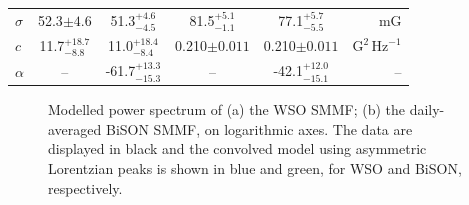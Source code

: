 \begin{table}[ht!]
\begin{center}
\begin{tabular}{l c c | c c r}
			{$\sigma$} & {52.3$\pm 4.6$} & {51.3$_{-4.5}^{+4.6}$} & {81.5$_{-1.1}^{+5.1}$} & {77.1$_{-5.5}^{+5.7}$} & {$\mathrm{mG}$} \\	
			
			{$c$} & {11.7$_{-8.8}^{+18.7}$} & {11.0$_{-8.4}^{+18.4}$} & {0.210$\pm 0.011$} & {0.210$\pm 0.011$} & {$\mathrm{G}^2 \, \mathrm{Hz}^{-1}$} \\	
			
			{$\alpha$} & {--} & {-61.7$_{-15.3}^{+13.3}$} & {--} & {-42.1$_{-15.1}^{+12.0}$} & {--} \\	
			\hline
		\end{tabular}
	\end{center}
\end{table}





\begin{figure}[ht!]
	\centering
	\qquad
	\caption{Modelled power spectrum of (a) the WSO SMMF; (b) the daily-averaged BiSON SMMF, on logarithmic axes. The data are displayed in black and the convolved model using asymmetric Lorentzian peaks is shown in blue and green, for WSO and BiSON, respectively.} 
	\label{fig:WSO_and_24h_BiSON_PSD_fit}
\end{figure}

